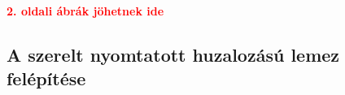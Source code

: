 \documentclass[11pt]{article}
\begin{document}
			\textbf{\textcolor{red}{2. oldali ábrák jöhetnek ide}}

		\subsection{A szerelt nyomtatott huzalozású lemez felépítése}

			\begin{figure}[!htb]%
				\hspace{\fill}
				\hspace{\fill}
			

\end{figure}
\end{document}

